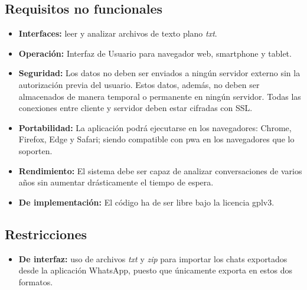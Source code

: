 \subsection{Requisitos no funcionales}

\begin{itemize}
	\item \textbf{Interfaces:} leer y analizar archivos de texto plano \textit{txt}. 
	
	\item \textbf{Operación:} Interfaz de Usuario para navegador web, smartphone y tablet.
	
	\item \textbf{Seguridad:} Los datos no deben ser enviados a ningún servidor externo sin la autorización previa del usuario. Estos datos, además, no deben ser almacenados de manera temporal o permanente en ningún servidor. Todas las conexiones entre cliente y servidor deben estar cifradas con SSL.
	
	\item \textbf{Portabilidad:} La aplicación podrá ejecutarse en los navegadores: Chrome, Firefox, Edge y Safari; siendo compatible con \acrshort{pwa} en los navegadores que lo soporten.
	
	\item \textbf{Rendimiento:} El sistema debe ser capaz de analizar conversaciones de varios años sin aumentar drásticamente el tiempo de espera.
	
	\item \textbf{De implementación:} El código ha de ser libre bajo la licencia \acrfull{gplv3}.
\end{itemize}

\subsection{Restricciones}

\begin{itemize}
	\item \textbf{De interfaz:} uso de archivos \textit{txt} y \textit{zip} para importar los chats exportados desde la aplicación WhatsApp, puesto que únicamente exporta en estos dos formatos.
\end{itemize}










